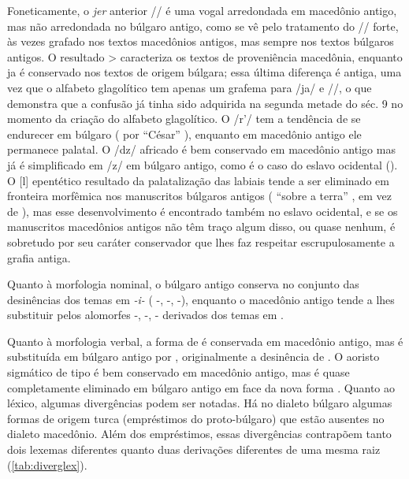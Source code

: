 Foneticamente, o \emph{jer} anterior /\jeru/ é uma vogal arredondada em
macedônio antigo, mas não arredondada no búlgaro antigo, como se vê pelo
tratamento do /\jeru/ forte, às vezes grafado  nos textos macedônios
antigos, mas sempre  nos textos búlgaros antigos.
O resultado  >  caracteriza os textos de proveniência
macedônia, enquanto ja é conservado nos textos de origem búlgara; essa última
diferença é antiga, uma vez que o alfabeto glagolítico tem apenas um grafema
para /ja/ e //, o que demonstra que a confusão já tinha sido adquirida na
segunda metade do séc. 9 no momento da criação do alfabeto glagolítico.
O /r’/ tem a tendência de se endurecer em búlgaro (
por  ``César'' ), enquanto em
macedônio antigo ele permanece palatal.
O /dz/ africado é bem conservado em macedônio antigo mas já é
simplificado em /z/ em búlgaro antigo, como é o caso do eslavo ocidental
().
O [l] epentético resultado da palatalização das labiais
tende a ser eliminado em fronteira morfêmica nos manuscritos búlgaros antigos
( ``sobre a terra'' , em vez de ), mas esse desenvolvimento é encontrado também no eslavo ocidental, e se
os manuscritos macedônios antigos não têm traço algum disso, ou quase nenhum, é
sobretudo por seu caráter conservador que lhes faz respeitar escrupulosamente a
grafia antiga.

Quanto à morfologia nominal, o búlgaro antigo conserva no conjunto das
desinências dos temas em \emph{-i-} ( -,
 -,  -), enquanto o
macedônio antigo tende a lhes substituir pelos alomorfes -,
-, - derivados dos temas em .

Quanto à morfologia verbal, a forma de   é conservada
em macedônio antigo, mas é substituída em búlgaro antigo por ,
originalmente a desinência de .
O aoristo sigmático de tipo  é bem conservado em macedônio antigo,
mas é quase completamente eliminado em búlgaro antigo em face da nova forma
.
Quanto ao léxico, algumas divergências podem ser notadas.
Há no dialeto búlgaro algumas formas de origem turca (empréstimos do
proto-búlgaro) que estão ausentes no dialeto macedônio.
Além dos empréstimos, essas divergências contrapõem tanto dois lexemas
diferentes quanto duas derivações diferentes de uma mesma raiz
(\autoref{tab:diverglex}).


